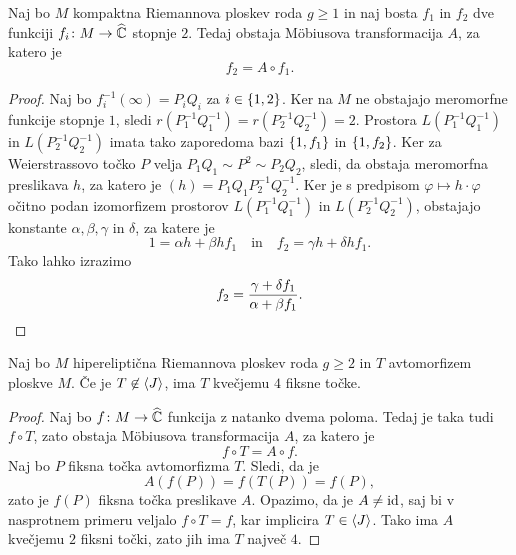 \begin{trditev}
Naj bo $M$ kompaktna Riemannova ploskev roda $g \geq 1$ in naj
bosta $f_1$ in $f_2$ dve funkciji $f_i \colon M \to \widehat{\mathbb{C}}$ stopnje
$2$. Tedaj obstaja Möbiusova transformacija $A$, za katero je
\[
f_2 = A \circ f_1.
\]
\end{trditev}

\begin{proof}
Naj bo $f_i^{-1}(\infty) = P_i Q_i$ za $i \in \left\{1,2\right\}$. Ker na
$M$ ne obstajajo meromorfne funkcije stopnje $1$, sledi
$r(P_1^{-1} Q_1^{-1}) = r(P_2^{-1} Q_2^{-1}) = 2$. Prostora
$L(P_1^{-1} Q_1^{-1})$ in $L(P_2^{-1} Q_2^{-1})$ imata tako
zaporedoma bazi $\left\{1, f_1\right\}$ in $\left\{1, f_2\right\}$. Ker za
Weierstrassovo točko $P$ velja $P_1 Q_1 \sim P^2 \sim P_2 Q_2$,
sledi, da obstaja meromorfna preslikava $h$, za katero je
$(h) = P_1 Q_1 P_2^{-1} Q_2^{-1}$. Ker je s predpisom
$\varphi \mapsto h \cdot \varphi$ očitno podan izomorfizem
prostorov $L(P_1^{-1} Q_1^{-1})$ in $L(P_2^{-1} Q_2^{-1})$,
obstajajo konstante $\alpha, \beta, \gamma$ in $\delta$, za katere
je
\[
1 = \alpha h + \beta hf_1
\quad \text{in} \quad
f_2 = \gamma h + \delta hf_1.
\]
Tako lahko izrazimo
\[
f_2 = \frac{\gamma + \delta f_1}{\alpha + \beta f_1}. \qedhere
\]
\end{proof}

\begin{trditev}
Naj bo $M$ hipereliptična Riemannova ploskev roda $g \geq 2$ in
$T$ avtomorfizem ploskve $M$. Če je $T \not \in \left\langle J\right\rangle$, ima $T$
kvečjemu $4$ fiksne točke.
\end{trditev}

\begin{proof}
Naj bo $f \colon M \to \widehat{\mathbb{C}}$ funkcija z natanko dvema poloma. Tedaj
je taka tudi $f \circ T$, zato obstaja Möbiusova transformacija
$A$, za katero je
\[
f \circ T = A \circ f.
\]
Naj bo $P$ fiksna točka avtomorfizma $T$. Sledi, da je
\[
A(f(P)) = f(T(P)) = f(P),
\]
zato je $f(P)$ fiksna točka preslikave $A$. Opazimo, da je
$A \ne \operatorname{id}$, saj bi v nasprotnem primeru veljalo $f \circ T = f$,
kar implicira $T \in \left\langle J\right\rangle$. Tako ima $A$ kvečjemu $2$ fiksni
točki, zato jih ima $T$ največ $4$.
\end{proof}

